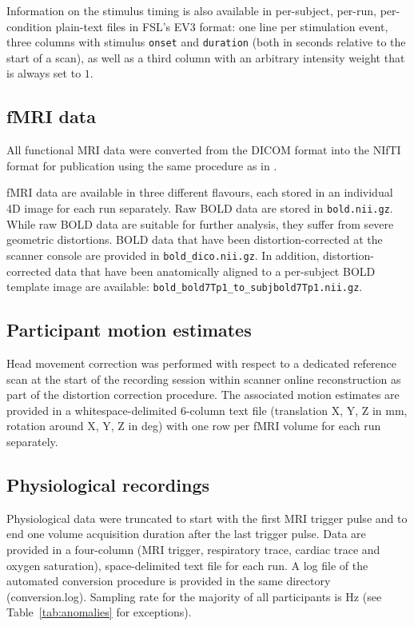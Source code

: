 Information on the stimulus timing is also available in per-subject, per-run,
per-condition plain-text files in FSL's EV3 format: one line per stimulation
event, three columns with stimulus \texttt{onset} and \texttt{duration} (both
in seconds relative to the start of a scan), as well as a third column with an
arbitrary intensity weight that is always set to $1$.

\subsection*{fMRI data}

All functional MRI data were converted from the DICOM format into the NIfTI
format for publication using the same procedure as in \cite{HBI+14}.

fMRI data are available in three different flavours, each stored in an
individual 4D image for each run separately. Raw BOLD data are stored in
\texttt{bold.nii.gz}. While raw BOLD data are suitable for further analysis,
they suffer from severe geometric distortions. BOLD data that have been
distortion-corrected \cite{IS2012} at the scanner console are provided in
\texttt{bold\_dico.nii.gz}. In addition, distortion-corrected data that
have been anatomically aligned to a per-subject  BOLD template image
are available: \texttt{bold\_bold7Tp1\_to\_subjbold7Tp1.nii.gz}.

\subsection*{Participant motion estimates}

Head movement correction was performed with respect to a dedicated reference
scan at the start of the recording session within scanner online reconstruction
as part of the distortion correction procedure. The associated motion estimates
are provided in a whitespace-delimited 6-column text file (translation X, Y, Z
in mm, rotation around X, Y, Z in deg) with one row per fMRI volume for each
run separately.

\subsection*{Physiological recordings}

Physiological data were truncated to start with the first MRI trigger pulse and
to end one volume acquisition duration after the last trigger pulse. Data are
provided in a four-column (MRI trigger, respiratory trace, cardiac trace and
oxygen saturation), space-delimited text file for each run. A log file of the
automated conversion procedure is provided in the same directory
(conversion.log). Sampling rate for the majority of all participants is
\unit[200]{Hz} (see Table~\ref{tab:anomalies} for exceptions). 

